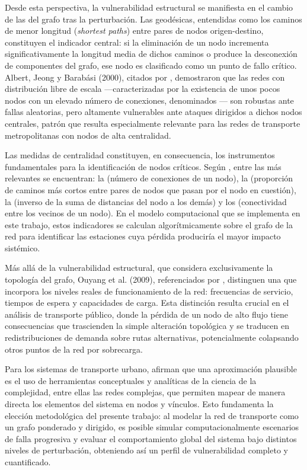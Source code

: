 Desde esta perspectiva, la vulnerabilidad estructural se manifiesta en el cambio
de
las  del grafo tras la perturbación. Las geodésicas,
entendidas
como los caminos de menor longitud (\textit{shortest paths}) entre pares de
nodos
origen-destino, constituyen el indicador central: si la eliminación de un nodo
incrementa significativamente la longitud media de dichos caminos o produce la
desconexión de componentes del grafo, ese nodo es clasificado como un punto de
fallo crítico. Albert, Jeong y Barabási (2000), citados por
\citet{loterovélez2014},
demostraron que las redes con distribución libre de escala ---caracterizadas por
la
existencia de unos pocos nodos con un elevado número de conexiones, denominados
--- son robustas ante fallas aleatorias, pero altamente
vulnerables ante
ataques dirigidos a dichos nodos centrales, patrón que resulta especialmente
relevante para las redes de transporte metropolitanas con nodos de alta
centralidad.

Las medidas de centralidad constituyen, en consecuencia, los instrumentos
fundamentales para la identificación de nodos críticos. Según
\citet{loterovélez2014},
entre las más relevantes se encuentran: la 
(número de conexiones de un nodo), la 
(proporción de caminos más cortos entre pares de nodos que pasan por el nodo en
cuestión), la  (inverso de la suma de
distancias del
nodo a los demás) y los  (conectividad entre
los
vecinos de un nodo). En el modelo computacional que se implementa en este
trabajo,
estos indicadores se calculan algorítmicamente sobre el grafo de la red para
identificar las estaciones cuya pérdida produciría el mayor impacto sistémico.

Más allá de la vulnerabilidad estructural, que considera exclusivamente la
topología
del grafo, Ouyang et al. (2009), referenciados por \citet{loterovélez2014},
distinguen una  que incorpora los niveles
reales de
funcionamiento de la red: frecuencias de servicio, tiempos de espera y
capacidades
de carga. Esta distinción resulta crucial en el análisis de transporte público,
donde la
pérdida de un nodo de alto flujo tiene consecuencias que trascienden la simple
alteración topológica y se traducen en redistribuciones de demanda sobre rutas
alternativas, potencialmente colapsando otros puntos de la red por sobrecarga.
 
Para los sistemas de transporte urbano, \citet{loterovélez2014} afirman que
una
aproximación plausible es el uso de herramientas conceptuales y analíticas de la
ciencia de la complejidad, entre ellas las redes complejas, que permiten mapear
de
manera directa los elementos del sistema en nodos y vínculos. Esto fundamenta la
elección metodológica del presente trabajo: al modelar la red de transporte como
un
grafo ponderado y dirigido, es posible simular computacionalmente escenarios de
falla progresiva y evaluar el comportamiento global del sistema bajo distintos
niveles
de perturbación, obteniendo así un perfil de vulnerabilidad completo y
cuantificado.


